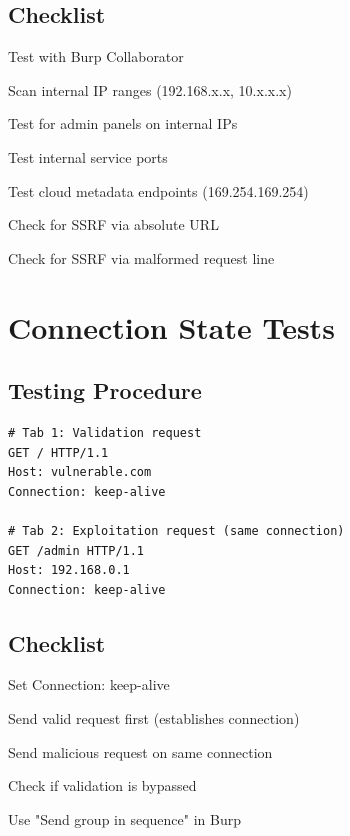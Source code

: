 \documentclass[12pt,a4paper]{article}
\begin{document}
\subsection{Checklist}
\begin{checklistbox}
 Test with Burp Collaborator
\end{checklistbox}
\begin{checklistbox}
 Scan internal IP ranges (192.168.x.x, 10.x.x.x)
\end{checklistbox}
\begin{checklistbox}
 Test for admin panels on internal IPs
\end{checklistbox}
\begin{checklistbox}
 Test internal service ports
\end{checklistbox}
\begin{checklistbox}
 Test cloud metadata endpoints (169.254.169.254)
\end{checklistbox}
\begin{checklistbox}
 Check for SSRF via absolute URL
\end{checklistbox}
\begin{checklistbox}
 Check for SSRF via malformed request line
\end{checklistbox}

\section{Connection State Tests}

\subsection{Testing Procedure}
\begin{lstlisting}[caption=Connection State Test Sequence]
# Tab 1: Validation request
GET / HTTP/1.1
Host: vulnerable.com
Connection: keep-alive

# Tab 2: Exploitation request (same connection)
GET /admin HTTP/1.1
Host: 192.168.0.1
Connection: keep-alive
\end{lstlisting}

\subsection{Checklist}
\begin{checklistbox}
 Set Connection: keep-alive
\end{checklistbox}
\begin{checklistbox}
 Send valid request first (establishes connection)
\end{checklistbox}
\begin{checklistbox}
 Send malicious request on same connection
\end{checklistbox}
\begin{checklistbox}
 Check if validation is bypassed
\end{checklistbox}
\begin{checklistbox}
 Use "Send group in sequence" in Burp
\end{checklistbox}
\end{document}

